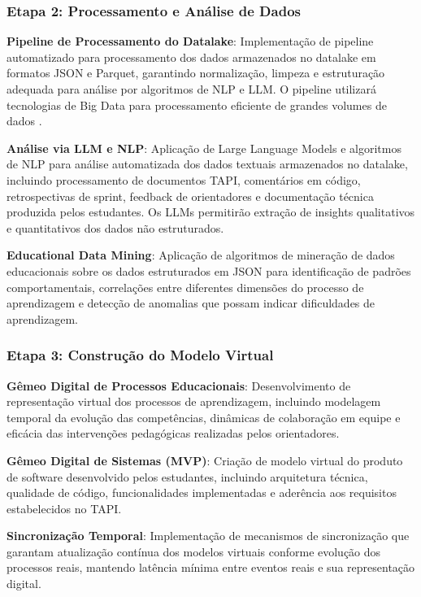 \documentclass[12pt,a4paper]{article}
\renewcommand{\cite}[1]{}
\begin{document}
\subsubsection{Etapa 2: Processamento e Análise de Dados}

\textbf{Pipeline de Processamento do Datalake}: Implementação de pipeline automatizado para processamento dos dados armazenados no datalake em formatos JSON e Parquet, garantindo normalização, limpeza e estruturação adequada para análise por algoritmos de NLP e LLM. O pipeline utilizará tecnologias de Big Data para processamento eficiente de grandes volumes de dados \cite{romero2020}.

\textbf{Análise via LLM e NLP}: Aplicação de Large Language Models e algoritmos de NLP para análise automatizada dos dados textuais armazenados no datalake, incluindo processamento de documentos TAPI, comentários em código, retrospectivas de sprint, feedback de orientadores e documentação técnica produzida pelos estudantes. Os LLMs permitirão extração de insights qualitativos e quantitativos dos dados não estruturados.

\textbf{Educational Data Mining}: Aplicação de algoritmos de mineração de dados educacionais \cite{romero2010} sobre os dados estruturados em JSON para identificação de padrões comportamentais, correlações entre diferentes dimensões do processo de aprendizagem e detecção de anomalias que possam indicar dificuldades de aprendizagem.

\subsubsection{Etapa 3: Construção do Modelo Virtual}

\textbf{Gêmeo Digital de Processos Educacionais}: Desenvolvimento de representação virtual dos processos de aprendizagem, incluindo modelagem temporal da evolução das competências, dinâmicas de colaboração em equipe e eficácia das intervenções pedagógicas realizadas pelos orientadores.

\textbf{Gêmeo Digital de Sistemas (MVP)}: Criação de modelo virtual do produto de software desenvolvido pelos estudantes, incluindo arquitetura técnica, qualidade de código, funcionalidades implementadas e aderência aos requisitos estabelecidos no TAPI.

\textbf{Sincronização Temporal}: Implementação de mecanismos de sincronização que garantam atualização contínua dos modelos virtuais conforme evolução dos processos reais, mantendo latência mínima entre eventos reais e sua representação digital.
\end{document}
